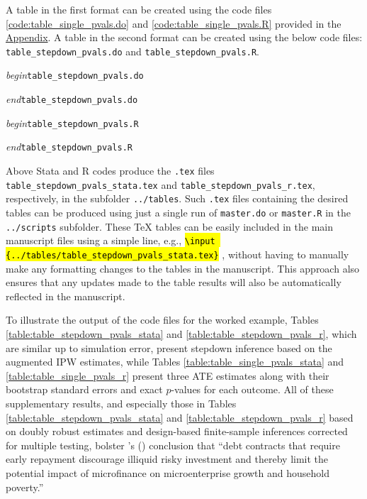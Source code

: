 \documentclass[12pt]{article}
\newcommand{\hlc}[2][yellow]{{%
    \colorlet{foo}{#1}%
    \sethlcolor{foo}\hl{#2}}%
}
\newcommand{\ctext}[1]{\hlc[teal!20]{\texttt{#1}}}
\begin{document}
A table in the first format can be created using the code files \ref{code:table_single_pvals.do} and \ref{code:table_single_pvals.R} provided in the \hyperref[sec:appendix]{Appendix}. A table in the second format can be created using the below code files: \texttt{table\_stepdown\_pvals.do} and \texttt{table\_stepdown\_pvals.R}.

\vspace{5mm}

\lstset{basicstyle=\scriptsize\ttfamily,breaklines=true}

\noindent \textit{begin}\quad \texttt{table\_stepdown\_pvals.do}

\vspace{-3mm}
\noindent \textit{end}\quad \texttt{table\_stepdown\_pvals.do}

\vspace{5mm}

\lstset{basicstyle=\scriptsize\ttfamily,breaklines=true}

\noindent \textit{begin}\quad \texttt{table\_stepdown\_pvals.R}

\vspace{-3mm}
\noindent \textit{end}\quad \texttt{table\_stepdown\_pvals.R}

\vspace{5mm}

Above Stata and R codes produce the \texttt{.tex} files \texttt{table\_stepdown\_pvals\_stata.tex} and \texttt{table\_stepdown\_pvals\_r.tex}, respectively, in the subfolder \texttt{../tables}. Such \texttt{.tex} files containing the desired tables can be produced using just a single run of \texttt{master.do} or \texttt{master.R} in the \texttt{../scripts} subfolder. These TeX tables can be easily included in the main manuscript files using a simple line, e.g., \ctext{\textbackslash input \{../tables/table\_stepdown\_pvals\_stata.tex\}}, without having to manually make any formatting changes to the tables in the manuscript. This approach also ensures that any updates made to the table results will also be automatically reflected in the manuscript.

To illustrate the output of the code files for the worked example, Tables \ref{table:table_stepdown_pvals_stata} and \ref{table:table_stepdown_pvals_r}, which are similar up to simulation error, present stepdown inference based on the augmented IPW estimates, while Tables \ref{table:table_single_pvals_stata} and \ref{table:table_single_pvals_r} present three ATE estimates along with their bootstrap standard errors and exact $p$-values for each outcome. All of these supplementary results, and especially those in Tables \ref{table:table_stepdown_pvals_stata} and \ref{table:table_stepdown_pvals_r} based on doubly robust estimates and design-based finite-sample inferences corrected for multiple testing, bolster \citeauthor{field2013does}'s (\citeyear{field2013does}) conclusion that ``debt contracts that require early repayment discourage illiquid risky investment and thereby limit the potential impact of microfinance on microenterprise growth and household poverty.''
\end{document}
